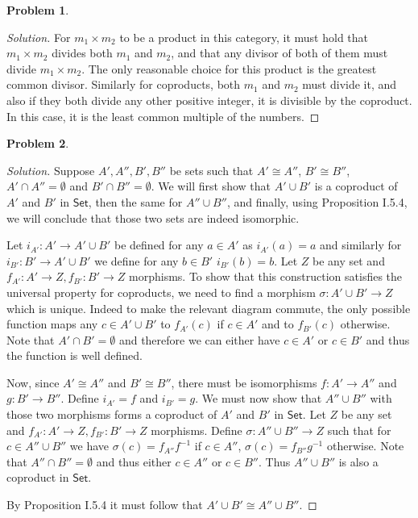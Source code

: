\documentclass{article}
\theoremstyle{definition}
\newtheorem{problem-internal}{Problem}[subsection]
\newenvironment{problem}{
	\medskip
	\begin{problem-internal}
	}{
\end{problem-internal}
}
\newenvironment{solution}{
	\begin{proof}[Solution]
		\vspace{-8px}
		\setlength{\parskip}{4px}
		\setlength{\parindent}{0px}
	}{
\end{proof}
}
\begin{document}
\begin{problem}
\end{problem}

\begin{solution}
	For $m_1 \times m_2$ to be a product in this category, it must hold that $m_1 \times m_2$ divides both $m_1$ and $m_2$, and that any divisor of both of them must divide $m_1 \times m_2$. The only reasonable choice for this product is the greatest common divisor. Similarly for coproducts, both $m_1$ and $m_2$ must divide it, and also if they both divide any other positive integer, it is divisible by the coproduct. In this case, it is the least common multiple of the numbers.
\end{solution}

\begin{problem}
\end{problem}

\begin{solution}
	Suppose $A', A'', B', B''$ be sets such that $A' \cong A''$, $B' \cong B''$, $A' \cap A'' = \emptyset$ and $B' \cap B'' = \emptyset$. We will first show that $A' \cup B'$ is a coproduct of $A'$ and $B'$ in $\mathsf{Set}$, then the same for $A'' \cup B''$, and finally, using Proposition I.5.4, we will conclude that those two sets are indeed isomorphic.
	
	Let $i_{A'}: A' \to A' \cup B'$ be defined for any $a \in A'$ as $i_{A'}(a) = a$ and similarly for $i_{B'}: B' \to A' \cup B'$ we define for any $b \in B'$ $i_{B'}(b) = b$. Let $Z$ be any set and $f_{A'}: A' \to Z, f_{B'}: B' \to Z$ morphisms. To show that this construction satisfies the universal property for coproducts, we need to find a morphism $\sigma: A' \cup B' \to Z$ which is unique. Indeed to make the relevant diagram commute, the only possible function maps any $c \in A' \cup B'$ to $f_{A'}(c)$ if $c \in A'$ and to $f_{B'}(c)$ otherwise. Note that $A' \cap B' = \emptyset$ and therefore we can either have $c \in A'$ or $c \in B'$ and thus the function is well defined.
	
	Now, since $A' \cong A''$ and $B' \cong B''$, there must be isomorphisms $f : A' \to A''$ and $g: B' \to B''$. Define $i_{A'}=f$ and $i_{B'}=g$. We must now show that $A'' \cup B''$ with those two morphisms forms a coproduct of $A'$ and $B'$ in $\mathsf{Set}$. Let $Z$ be any set and $f_{A'}: A' \to Z, f_{B'}: B' \to Z$ morphisms. Define $\sigma: A'' \cup B'' \to Z$ such that for $c \in A'' \cup B''$ we have $\sigma(c)=f_{A''}f^{-1}$ if $c \in A''$, $\sigma(c)=f_{B''}g^{-1}$ otherwise. Note that $A'' \cap B'' = \emptyset$ and thus either $c \in A''$ or $c \in B''$. Thus $A'' \cup B''$ is also a coproduct in $\mathsf{Set}$.
	
	By Proposition I.5.4 it must follow that $A' \cup B' \cong A'' \cup B''$.
\end{solution}
\end{document}
